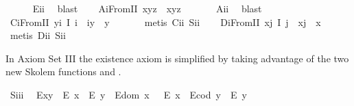 \begin{isabellebody}
%
\isadelimproof
\ \ \ \ %
\endisadelimproof
%
\isatagproof
{}\isamarkupfalse%
\ E\isactrlsub i\isactrlsub i\ \isamarkupfalse%
\ blast%
\endisatagproof
{\isafoldproof}%
%
\isadelimproof
\isanewline
%
\endisadelimproof
\ \ \isamarkupfalse%
\ A\isactrlsub iFromII{\isacharcolon}\ {\isachardoublequoteopen}x{\isasymcdot}{\isacharparenleft}y{\isasymcdot}z{\isacharparenright}\ {\isasymcong}\ {\isacharparenleft}x{\isasymcdot}y{\isacharparenright}{\isasymcdot}z{\isachardoublequoteclose}\ \isanewline
%
\isadelimproof
\ \ \ \ %
\endisadelimproof
%
\isatagproof
{}\isamarkupfalse%
\ A\isactrlsub i\isactrlsub i\ \isamarkupfalse%
\ blast%
\endisatagproof
{\isafoldproof}%
%
\isadelimproof
\isanewline
%
\endisadelimproof
\ \ \isamarkupfalse%
\ C\isactrlsub iFromII{\isacharcolon}\ {\isachardoublequoteopen}\isactrlbold {\isasymforall}y{\isachardot}\isactrlbold {\isasymexists}i{\isachardot}\ I\ i\ \isactrlbold {\isasymand}\ i{\isasymcdot}y\ {\isasymcong}\ y{\isachardoublequoteclose}\ \isanewline
%
\isadelimproof
\ \ \ \ %
\endisadelimproof
%
\isatagproof
{}\isamarkupfalse%
\ {\isacharparenleft}metis\ C\isactrlsub i\isactrlsub i\ S\isactrlsub i\isactrlsub i{\isacharparenright}%
\endisatagproof
{\isafoldproof}%
%
\isadelimproof
\isanewline
%
\endisadelimproof
\ \ \isamarkupfalse%
\ D\isactrlsub iFromII{\isacharcolon}\ {\isachardoublequoteopen}\isactrlbold {\isasymforall}x{\isachardot}\isactrlbold {\isasymexists}j{\isachardot}\ I\ j\ \isactrlbold {\isasymand}\ x{\isasymcdot}j\ {\isasymcong}\ x{\isachardoublequoteclose}\ \isanewline
%
\isadelimproof
\ \ \ \ %
\endisadelimproof
%
\isatagproof
{}\isamarkupfalse%
\ {\isacharparenleft}metis\ D\isactrlsub i\isactrlsub i\ S\isactrlsub i\isactrlsub i{\isacharparenright}%
\endisatagproof
{\isafoldproof}%
%
\isadelimproof
%
\endisadelimproof
%
\isamarkuptrue%
%
\begin{isamarkuptext}%
In Axiom Set III the existence  axiom   is simplified by taking advantage of 
  the two new Skolem functions  and .%
\end{isamarkuptext}\isamarkuptrue%
\ S\isactrlsub i\isactrlsub i\isactrlsub i{\isacharcolon}\ %
\ {\isachardoublequoteopen}{\isacharparenleft}E{\isacharparenleft}x{\isasymcdot}y{\isacharparenright}\ \isactrlbold {\isasymrightarrow}\ {\isacharparenleft}E\ x\ \isactrlbold {\isasymand}\ E\ y{\isacharparenright}{\isacharparenright}\ \isactrlbold {\isasymand}\ {\isacharparenleft}E{\isacharparenleft}dom\ x\ {\isacharparenright}\ \isactrlbold {\isasymrightarrow}\ E\ x{\isacharparenright}\ \isactrlbold {\isasymand}\ {\isacharparenleft}E{\isacharparenleft}cod\ y{\isacharparenright}\ \isactrlbold {\isasymrightarrow}\ E\ y{\isacharparenright}{\isachardoublequoteclose}\ \ \isanewline

\end{isabellebody}

